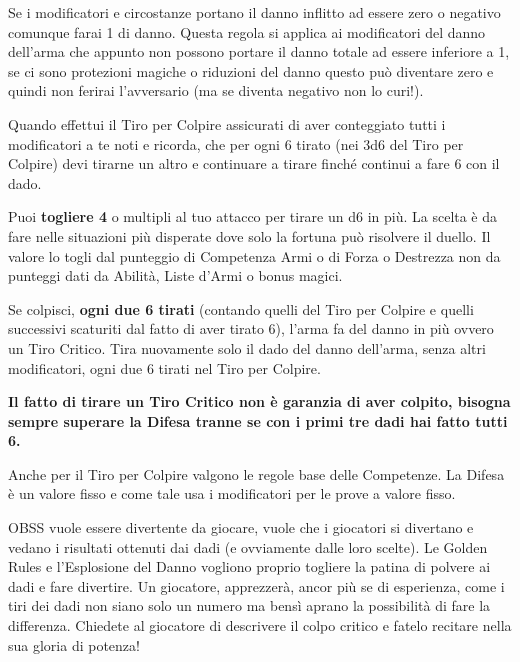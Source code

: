 \begin{multicols}{2}
Se i modificatori e circostanze portano il danno inflitto ad essere zero o negativo comunque farai 1 di danno.
Questa regola si applica ai modificatori del danno dell'arma che appunto non possono portare il danno totale ad essere inferiore a 1, se ci sono protezioni magiche o riduzioni del danno questo può diventare zero e quindi non ferirai l'avversario (ma se diventa negativo non lo curi!).

Quando effettui il Tiro per Colpire assicurati di aver conteggiato tutti i modificatori a te noti e ricorda, che per ogni 6 tirato (nei 3d6 del Tiro per Colpire) devi tirarne un altro e continuare a tirare finché continui a fare 6 con il dado.

Puoi \textbf{togliere 4} o multipli al tuo attacco per tirare un d6 in più. La scelta è da fare nelle situazioni più disperate dove solo la fortuna può risolvere il duello. Il valore lo togli dal punteggio di Competenza Armi o di Forza o Destrezza non da punteggi dati da Abilità, Liste d'Armi o bonus magici.

Se colpisci, \textbf{ogni due 6 tirati} (contando quelli del Tiro per Colpire e quelli successivi scaturiti dal fatto di aver tirato 6), l'arma fa del danno in più ovvero un Tiro Critico. Tira nuovamente solo il dado del danno dell'arma, senza altri modificatori, ogni due 6 tirati nel Tiro per Colpire.

\textbf{Il fatto di tirare un Tiro Critico non è garanzia di aver colpito, bisogna sempre superare la Difesa tranne se con i primi tre dadi hai fatto tutti 6.}

Anche per il Tiro per Colpire valgono le regole base delle Competenze. La Difesa è un valore fisso e come tale usa i modificatori per le prove a valore fisso.

\begin{changemargin}{0.3cm}{0.3cm}\begin{narratore}
OBSS vuole essere divertente da giocare, vuole che i giocatori si divertano e vedano i risultati ottenuti dai dadi (e ovviamente dalle loro scelte). Le Golden Rules e l'Esplosione del Danno vogliono proprio togliere la patina di polvere ai dadi e fare divertire. Un giocatore, apprezzerà, ancor più se di esperienza, come i tiri dei dadi non siano solo un numero ma bensì aprano la possibilità di fare la differenza. Chiedete al giocatore di descrivere il colpo critico e fatelo recitare nella sua gloria di potenza!
\end{narratore}\end{changemargin}


\end{multicols}
